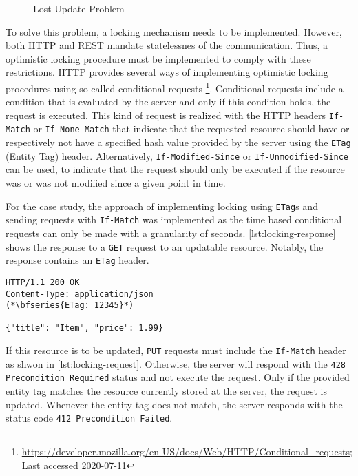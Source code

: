 \begin{figure}[!htb]
    \centering
    
    \caption{Lost Update Problem}
    \label{fig:lost-update}
\end{figure}

To solve this problem, a locking mechanism needs to be implemented.
However, both \ac{HTTP} and \ac{REST} mandate statelessnes of the communication.
Thus, a optimistic locking procedure must be implemented to comply with these restrictions.
\ac{HTTP} provides several ways of implementing optimistic locking procedures using so-called conditional requests \footnote{\url{https://developer.mozilla.org/en-US/docs/Web/HTTP/Conditional_requests}; Last accessed 2020-07-11}.
Conditional requests include a condition that is evaluated by the server and only if this condition holds, the request is executed.
This kind of request is realized with the \ac{HTTP} headers \texttt{If-Match} or \texttt{If-None-Match} that indicate that the requested resource should have or respectively not have a specified hash value provided by the server using the \texttt{ETag} (Entity Tag) header.
Alternatively, \texttt{If-Modified-Since} or \texttt{If-Unmodified-Since} can be used, to indicate that the request should only be executed if the resource was or was not modified since a given point in time.

For the case study, the approach of implementing locking using \texttt{ETag}s and sending requests with \texttt{If-Match} was implemented as the time based conditional requests can only be made with a granularity of seconds.
\autoref{lst:locking-response} shows the response to a \texttt{GET} request to an updatable resource.
Notably, the response contains an \texttt{ETag} header.

\begin{lstlisting}[caption={Response to \texttt{GET} requests for updatable resources}, showlines=true, label=lst:locking-response]
HTTP/1.1 200 OK
Content-Type: application/json
(*\bfseries{ETag: 12345}*)

{"title": "Item", "price": 1.99}
\end{lstlisting}

If this resource is to be updated, \texttt{PUT} requests must include the \texttt{If-Match} header as shwon in \autoref{lst:locking-request}.
Otherwise, the server will respond with the \texttt{428 Precondition Required} status and not execute the request.
Only if the provided entity tag matches the resource currently stored at the server, the request is updated.
Whenever the entity tag does not match, the server responds with the status code \texttt{412 Precondition Failed}.

